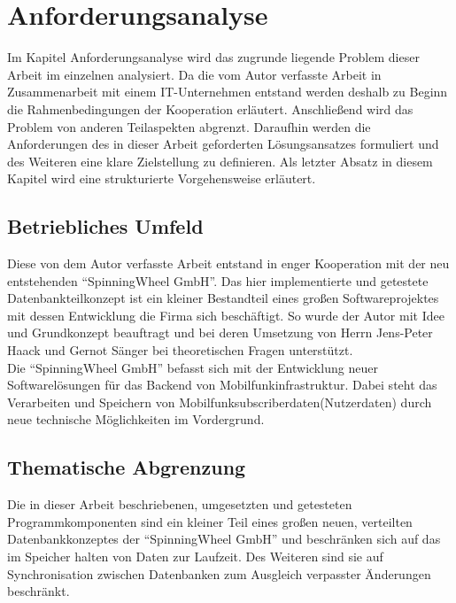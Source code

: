 \documentclass[a4paper,11pt,oneside,%
headsepline,												%
footsepline,												%
bibtotocnumbered									%
]{scrreprt}
\begin{document}
\chapter{Anforderungsanalyse}
Im Kapitel Anforderungsanalyse wird das zugrunde liegende Problem dieser Arbeit im einzelnen analysiert. Da die vom Autor verfasste Arbeit in Zusammenarbeit mit einem IT-Unternehmen entstand werden deshalb zu Beginn die Rahmenbedingungen der Kooperation erläutert. Anschließend wird das Problem von anderen Teilaspekten abgrenzt. Daraufhin werden die Anforderungen des in dieser Arbeit geforderten Lösungsansatzes formuliert und des Weiteren eine klare Zielstellung zu definieren.  
Als letzter Absatz in diesem Kapitel wird eine strukturierte Vorgehensweise erläutert.

\section{Betriebliches Umfeld}
Diese von dem Autor verfasste Arbeit entstand in enger Kooperation mit der neu entstehenden \enquote{SpinningWheel GmbH}. Das hier implementierte und getestete Datenbankteilkonzept ist ein kleiner Bestandteil eines großen Softwareprojektes mit dessen Entwicklung die Firma sich beschäftigt. So wurde der Autor mit Idee und Grundkonzept beauftragt und bei deren Umsetzung von Herrn Jens-Peter Haack und Gernot Sänger bei theoretischen Fragen unterstützt.\\

Die \enquote{SpinningWheel GmbH} befasst sich mit der Entwicklung neuer Softwarelösungen für das Backend von Mobilfunkinfrastruktur. Dabei steht das Verarbeiten und Speichern von Mobilfunksubscriberdaten(Nutzerdaten) durch neue technische Möglichkeiten im Vordergrund.

\section{Thematische Abgrenzung}
Die in dieser Arbeit beschriebenen, umgesetzten und getesteten Programmkomponenten sind ein kleiner Teil eines großen neuen, verteilten Datenbankkonzeptes der \enquote{SpinningWheel GmbH} und beschränken sich auf das im Speicher halten von Daten zur Laufzeit. Des Weiteren sind sie auf Synchronisation zwischen Datenbanken zum Ausgleich verpasster Änderungen beschränkt.\\
\end{document}
